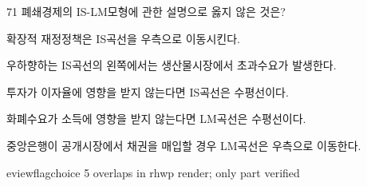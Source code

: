 \begin{question}{71}
폐쇄경제의 IS-LM모형에 관한 설명으로 옳지 않은 것은?
\begin{choices}
  \item 확장적 재정정책은 IS곡선을 우측으로 이동시킨다.
  \item 우하향하는 IS곡선의 왼쪽에서는 생산물시장에서 초과수요가 발생한다.
  \item 투자가 이자율에 영향을 받지 않는다면 IS곡선은 수평선이다.
  \item 화폐수요가 소득에 영향을 받지 않는다면 LM곡선은 수평선이다.
  \item 중앙은행이 공개시장에서 채권을 매입할 경우 LM곡선은 우측으로 이동한다.
\end{choices}

eviewflag{choice 5 overlaps in rhwp render; only part verified}
\end{question}
